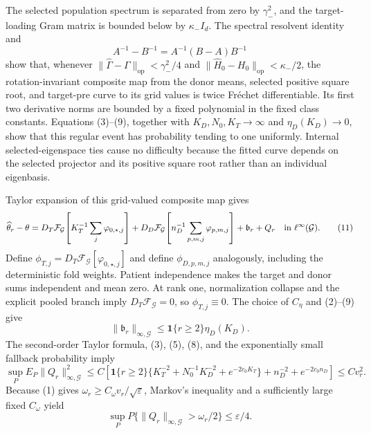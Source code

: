 The selected population spectrum is separated from zero by \(\gamma_-^2\), and the target-loading Gram matrix is bounded below by \(\kappa_-I_d\). The spectral resolvent identity and
\[
 A^{-1}-B^{-1}=A^{-1}(B-A)B^{-1} \tag{10}
\]
show that, whenever \(\|\widehat\Gamma-\Gamma\|_{\mathrm{op}}<\gamma_-^2/4\) and \(\|\widehat H_0-H_0\|_{\mathrm{op}}<\kappa_-/2\), the rotation-invariant composite map from the donor means, selected positive square root, and target-pre curve to its grid values is twice Fr\'echet differentiable. Its first two derivative norms are bounded by a fixed polynomial in the fixed class constants. Equations (3)--(9), together with \(K_D,N_0,K_T\to\infty\) and \(\eta_D(K_D)\to0\), show that this regular event has probability tending to one uniformly. Internal selected-eigenspace ties cause no difficulty because the fitted curve depends on the selected projector and its positive square root rather than an individual eigenbasis.

Taylor expansion of this grid-valued composite map gives
\[
 \widehat\theta_r-\theta
 =D_T\mathcal F_{\mathcal G}\!\left[K_T^{-1}\sum_j\varphi_{0,\star,j}\right]
 +D_D\mathcal F_{\mathcal G}\!\left[n_D^{-1}\sum_{p,m,j}\varphi_{p,m,j}\right]
 +\mathfrak b_r+Q_r
 \quad\hbox{in }\ell^\infty(\mathcal G). \tag{11}
\]
Define \(\phi_{T,j}=D_T\mathcal F_{\mathcal G}[\varphi_{0,\star,j}]\) and define \(\phi_{D,p,m,j}\) analogously, including the deterministic fold weights. Patient independence makes the target and donor sums independent and mean zero. At rank one, normalization collapse and the explicit pooled branch imply \(D_T\mathcal F_{\mathcal G}=0\), so \(\phi_{T,j}\equiv0\). The choice of \(C_\eta\) and (2)--(9) give
\[
 \|\mathfrak b_r\|_{\infty,\mathcal G}
 \le\mathbf 1\{r\ge2\}\eta_D(K_D). \tag{12}
\]
The second-order Taylor formula, (3), (5), (8), and the exponentially small fallback probability imply
\[
 \sup_P E_P\|Q_r\|_{\infty,\mathcal G}^2
 \le C\left[
 \mathbf 1\{r\ge2\}\{K_T^{-2}+N_0^{-1}K_D^{-2}+e^{-2c_0K_T}\}
 +n_D^{-2}+e^{-2c_0n_D}
 \right]
 \le Cv_r^2. \tag{13}
\]
Because (1) gives \(\omega_r\ge C_\omega v_r/\sqrt\varepsilon\), Markov's inequality and a sufficiently large fixed \(C_\omega\) yield
\[
 \sup_P P\{\|Q_r\|_{\infty,\mathcal G}>\omega_r/2\}
 \le\varepsilon/4. \tag{14}
\]

